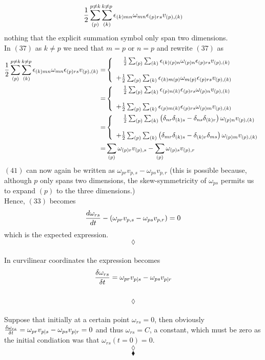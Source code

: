 \begin{align}
\frac{1}{2}\sum_{(p)}^{p\neq k}\sum_{(k)}^{k\neq p}\epsilon_{(k)mn}\omega_{mn}\epsilon_{(p)rs}v_{(p),(k)} 
\end{align}
nothing that the explicit summation symbol only span two dimensions.\\
In $(37)$ as $k\ne p$ we need that $m=p$ or $n= p$ and rewrite $(37)$ as
\begin{align}
\frac{1}{2}\sum_{(p)}^{p\neq k}\sum_{(k)}^{k\neq p}\epsilon_{(k)mn}\omega_{mn}\epsilon_{(p)rs}v_{(p),(k)} =&\left\{\begin{array}{l}\quad\frac{1}{2}\sum_{(p)}\sum_{(k)}\epsilon_{(k)(p)n}\omega_{(p)n}\epsilon_{(p)rs}v_{(p),(k)} \\\\
+\frac{1}{2}\sum_{(p)}\sum_{(k)}\epsilon_{(k)m(p)}\omega_{m(p)}\epsilon_{(p)rs}v_{(p),(k)} \end{array}\right.\\
=&\left\{\begin{array}{l}\quad\frac{1}{2}\sum_{(p)}\sum_{(k)}\epsilon_{(p)n(k)}\epsilon_{(p)rs}\omega_{(p)n}v_{(p),(k)} \\\\
+\frac{1}{2}\sum_{(p)}\sum_{(k)}\epsilon_{(p)m (k)}\epsilon_{(p)rs}\omega_{(p)m}v_{(p),(k)} \end{array}\right.
\\=&\left\{\begin{array}{l}\quad \frac{1}{2}\sum_{(p)}\sum_{(k)}\left(\delta_{nr}\delta_{(k)s}-\delta_{ns}\delta_{(k)r}\right)\omega_{(p)n}v_{(p),(k)} \\\\
+\frac{1}{2}\sum_{(p)}\sum_{(k)}\left(\delta_{mr}\delta_{(k)s}-\delta_{(k)r}\delta_{ms}\right)\omega_{(p)m}v_{(p),(k)} 
\end{array}\right.
\\= &\sum_{(p)}\omega_{(p)r}v_{(p),s} - \sum_{(p)}\omega_{(p)s}v_{(p),r}
\end{align}
$(41)$ can now again be written as $\omega_{pr}v_{p,s} - \omega_{ps}v_{p,r}$ (this is possible because, although $p$ only spans two dimensions, the skew-symmetricity of $\omega_{ps}$ permits us to expand $(p)$ to the three dimensions.)\\
Hence, $(33)$ becomes 
$$\dv{\omega_{rs}}{t}-\left( \omega_{pr}v_{p,s} - \omega_{ps}v_{p,r}\right)=0$$
which is the expected expression.
$$\lozenge$$\\
In curvilinear coordinates the expression becomes
$$\fdv{\omega_{rs}}{t}= \omega_{pr}v_{p|s} - \omega_{ps}v_{p|r}$$\\
$$\lozenge$$\\
Suppose that initially at a certain point $\omega_{rs}=0$, then obviously $\fdv{\omega_{rs}}{t}= \omega_{pr}v_{p|s} - \omega_{ps}v_{p|r}=0$ and thus $\omega_{rs} =C$, a constant, which must be zero as the initial condiation was that $\omega_{rs}(t=0)=0$.
$$\lozenge$$
 $$\blacklozenge$$
\newpage


